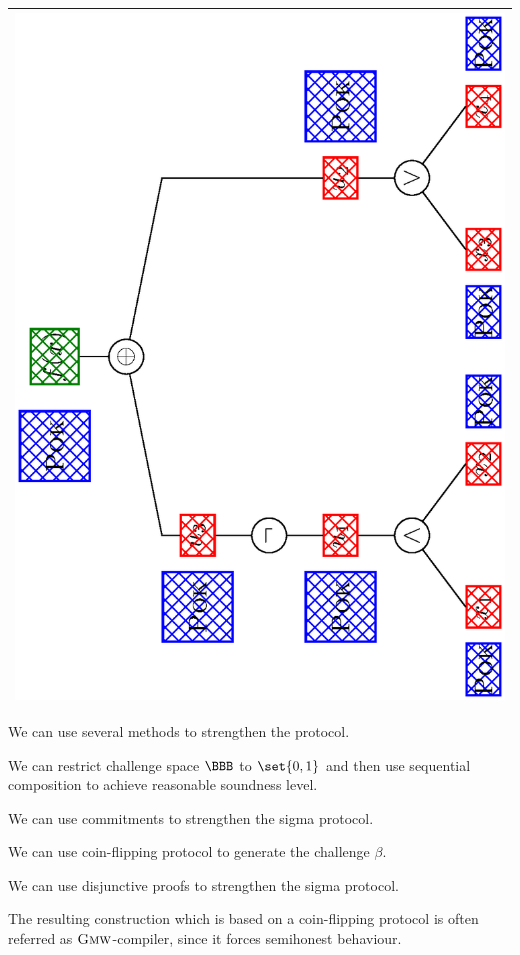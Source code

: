 \documentclass[landscape,footrule]{foils}
\begin{document}
\begin{center}
\begin{tabular}{|c|}
  \includegraphics[scale=0.18, angle=-90, clip, trim=3.0cm 0.0cm 3.5cm 0.0cm]{augmented-circuit-ii}\\
\hline
\end{tabular}
\end{center}


We can use several methods to strengthen the protocol. 
\begin{triangles}
\item We can restrict challenge space $\BBB$ to $\set{0,1}$ and then
  use sequential composition to achieve reasonable soundness level.
\item We can use commitments to strengthen the sigma protocol.
\item We can use coin-flipping protocol to generate the challenge $\beta$.
\item We can use disjunctive proofs to strengthen the sigma protocol.
\end{triangles}
\Bigskip

The resulting construction which is based on a coin-flipping protocol
is often referred as $\textsc{Gmw}$-compiler, since it forces
semihonest behaviour.
\end{document}
